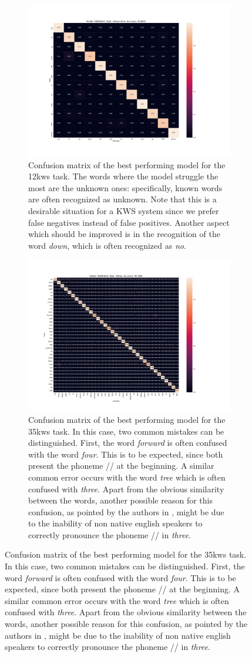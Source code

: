\begin{figure}
	\centering
	\begin{subfigure}{\textwidth}
		\centering
		\includegraphics[width=0.8\linewidth]{imgs/SQMHAtt5_12kws.pdf}
		\caption{Confusion matrix of the best performing model for the 12kws task. The words where the model struggle the most are the unknown ones: specifically, known words are often recognized as unknown. Note that this is a desirable situation for a KWS system since we prefer false negatives instead of false positives. Another aspect which should be improved is in the recognition of the word \textit{down}, which is often recognized as \textit{no}.}
	\end{subfigure}
	\begin{subfigure}{\textwidth}
		\centering

	\includegraphics[width=0.8\linewidth]{imgs/SQMHAtt2_35kws.pdf}
			\caption{Confusion matrix of the best performing model for the 35kws task. In this case, two common mistakes can be distinguished. First, the word \textit{forward} is often confused with the word \textit{four}. This is to be expected, since both present the phoneme // at the beginning. A similar common error occurs with the word \textit{tree} which is often confused with \textit{three}. Apart from the obvious similarity between the words, another possible reason for this confusion, as pointed by the authors in \cite{attention2018andreade}, might be due to the inability of non native english speakers to correctly pronounce the phoneme  // in \textit{three}.}
	\end{subfigure}
\end{figure}



